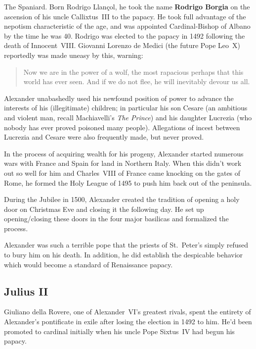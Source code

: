 The Spaniard.
Born Rodrigo Llan\c{c}ol,
he took the name \textbf{Rodrigo Borgia} on the ascension of his uncle Callixtus~III to the papacy.
He took full advantage of the nepotism characteristic of the age,
and was appointed Cardinal-Bishop of Albano by the time he was 40.
Rodrigo was elected to the papacy in 1492 following the death of Innocent~VIII\@.
Giovanni Lorenzo de Medici (the future Pope Leo~X) reportedly was made uneasy by this, warning:

\begin{quote}
  Now we are in the power of a wolf, the most rapacious perhaps that this world has ever seen.
  And if we do not flee, he will inevitably devour us all.
\end{quote}

Alexander unabashedly used his newfound position of power
to advance the interests of his (illegitimate) children;
in particular his son Cesare
(an ambitious and violent man, recall Machiavelli's \textit{The Prince})
and his daughter Lucrezia (who nobody has ever proved poisoned many people).
Allegations of incest between Lucrezia and Cesare were also frequently made, but never proved.

In the process of acquiring wealth for his progeny,
Alexander started numerous wars with France and Spain for land in Northern Italy.
When this didn't work out so well for him
and Charles~VIII of France came knocking on the gates of Rome,
he formed the Holy League of 1495 to push him back out of the peninsula.

During the Jubilee in 1500,
Alexander created the tradition of opening a holy door on Christmas Eve
and closing it the following day.
He set up opening/closing these doors in the four major basilicas and formalized the process.

Alexander was such a terrible pope that the priests
of St.\ Peter's simply refused to bury him on his death.
In addition, he did establish the despicable behavior which would become a standard of Renaissance papacy.

\subsection*{Julius II}

Giuliano della Rovere, one of Alexander~VI's greatest rivals,
spent the entirety of Alexander's pontificate in exile after losing the election in 1492 to him.
He'd been promoted to cardinal initially when his uncle Pope Sixtus~IV had begun his papacy.

